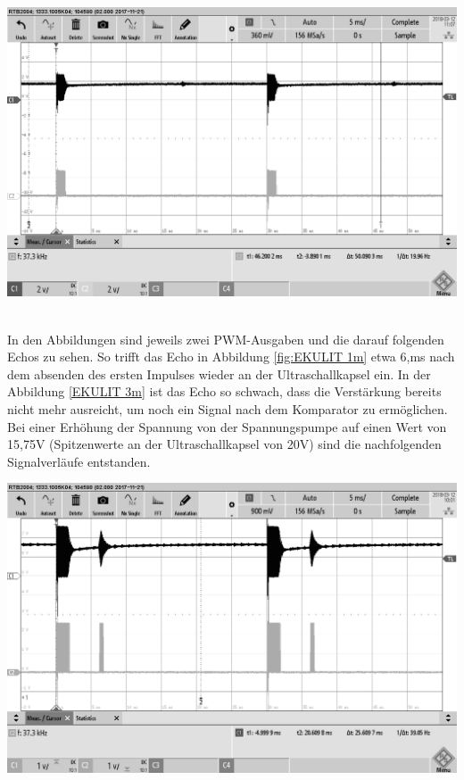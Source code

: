 \begin{minipage}{0.5\textwidth}
\includegraphics[width=1\textwidth%
]{Abbildungen/MessungenP2/10V/EKULIT3m.png}
\label{fig:EKULIT 3m}
\end{minipage}\\
In den Abbildungen sind jeweils zwei PWM-Ausgaben und die darauf folgenden Echos zu sehen. So trifft das Echo in Abbildung \ref{fig:EKULIT 1m} etwa 6,ms nach dem absenden des ersten Impulses  wieder an der Ultraschallkapsel ein. In der Abbildung \ref{EKULIT 3m} ist das Echo so schwach, dass die Verstärkung bereits nicht mehr ausreicht, um noch ein Signal nach dem Komparator zu ermöglichen.\\
Bei einer Erhöhung der Spannung von der Spannungspumpe auf einen Wert von 15,75V (Spitzenwerte an der Ultraschallkapsel von 20V) sind die nachfolgenden Signalverläufe entstanden.\\
\begin{minipage}{0.5\textwidth}
\includegraphics[width=1\textwidth%
]{Abbildungen/MessungenP2/15,75V/EKULIT1m.png}
\label{fig:EKULIT2 1m}
\end{minipage}
